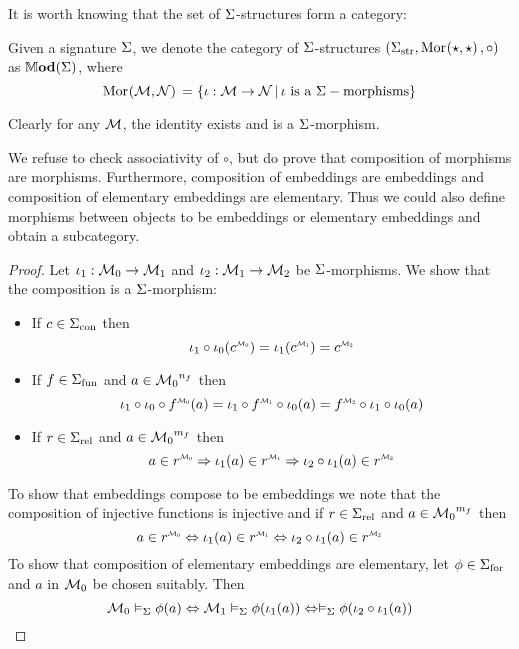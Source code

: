It is worth knowing that the set of $\Sigma$-structures form a category:
\begin{dfn}
    Given a signature $\Sigma$, 
    we denote the category of $\Sigma$-structures 
    $({\Sigma}_\mathrm{str}, \mathrm{Mor}_{}(\star, \star)\,, \circ)$
    as $\mathbb{M} \mathbf{od}(\Sigma)$,
    where \[\mathrm{Mor}_{}(\mathcal{M}, \mathcal{N})\, = 
    \left\{\iota : {\mathcal{M}} \to {\mathcal{N}} \,|\, 
    \iota \text{ is a } \Sigma-\text{morphisms}\right\}\]
    
    Clearly for any $\mathcal{M}$, 
    the identity exists and is a $\Sigma$-morphism.

    We refuse to check associativity of $\circ$,
    but do prove that composition of morphisms are morphisms.
    Furthermore, composition of embeddings are embeddings
    and composition of elementary embeddings are elementary.
    Thus we could also define morphisms between objects to be embeddings
    or elementary embeddings and obtain a subcategory.
\end{dfn}
\begin{proof}
    Let $\iota_1 : \mathcal{M}_0 \to \mathcal{M}_1$ and 
    $\iota_2 : \mathcal{M}_1 \to \mathcal{M}_2$ be $\Sigma$-morphisms.
    We show that the composition is a $\Sigma$-morphism:
    \begin{itemize}
        \item If $c \in {\Sigma}_\mathrm{con}$ then 
            \[
                \io_1 \circ \io_0 (\modintp{\MM_0}{c}) = 
                \io_1 (\modintp{\MM_1}{c}) = \modintp{\MM_2}{c}
            \]
        \item If $f \in {\Sigma}_\mathrm{fun}$ and 
            $a \in {\mathcal{M}_0}^{n_f}$ then
            \[
                \io_1 \circ \io_0 \circ \modintp{\MM_0}{f}(a) = 
                \io_1 \circ \modintp{\MM_1}{f} \circ \io_0 (a) = 
                \modintp{\MM_2}{f} \circ \io_1 \circ \io_0 (a)
            \]
        \item If $r \in {\Sigma}_\mathrm{rel}$ and 
            $a \in {\mathcal{M}_0}^{m_f}$ then
            \[
                a \in \modintp{\MM_0}{r} \implies \io_1 (a) \in \modintp{\MM_1}{r} 
                \implies \io_2 \circ \io_1 (a) \in \modintp{\MM_2}{r}
            \]
    \end{itemize}
    To show that embeddings compose to be embeddings we note that 
    the composition of injective functions is injective 
    and if $r \in {\Sigma}_\mathrm{rel}$ and 
    $a \in {\mathcal{M}_0}^{m_f}$ then
    \[
        a \in \modintp{\MM_0}{r} \iff \io_1 (a) \in \modintp{\MM_1}{r} 
        \iff \io_2 \circ \io_1 (a) \in \modintp{\MM_2}{r}
    \]
    To show that composition of elementary embeddings are elementary,
    let $\phi \in {\Sigma}_\mathrm{for}$ and $a$ in ${\mathcal{M}_0}$ be chosen suitably.
    Then
    \[
        \mathcal{M}_0 \vDash_{\Sigma} \phi(a) \Leftrightarrow \mathcal{M}_1 \vDash_{\Sigma} \phi(\iota_1 (a))
         \Leftrightarrow \vDash_{\Sigma} \phi(\iota_2 \circ \iota_1 (a))
    \]
\end{proof}

